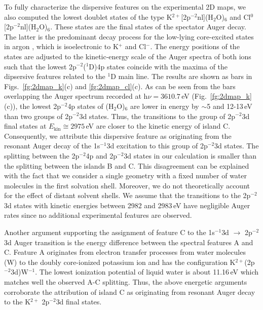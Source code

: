 To fully characterize the dispersive features on the experimental 2D maps, we also computed the lowest doublet states of the type K$^{2+}$[2p$^{-2}$nl](H$_2$O)$_6$ and Cl$^{0}$[2p$^{-2}$nl](H$_2$O)$_6$. These states are the final states of the spectator Auger decay. The latter is the predominant decay process for the low-lying core-excited states in argon \citep{ceolin15:022502}, which is isoelectronic to K$^+$ and Cl$^-$. The energy positions of the states are adjusted to the kinetic-energy scale of the Auger spectra of both ions such that the lowest 2p$^{-2}$($^1$D)4p states coincide with the maxima of the dipsersive features related to the $^1$D main line. The results are shown as bars in Figs.\ \ref{fg:2dmap_k}(c) and \ref{fg:2dmap_cl}(c). As can be seen from the bars overlapping the Auger spectrum recorded at h$\nu = 3610.7$\,eV (Fig.\ \ref{fg:2dmap_k}(c)), the lowest 2p$^{-2}$4p states of \ki(H$_2$O)$_6$ are lower in energy by $\sim$5 and 12-13\,eV than two groups of 2p$^{-2}$3d states. Thus, the transitions to the group of 2p$^{-2}$3d final states at $E_{\text{kin}}\cong 2975$\,eV are closer to the kinetic energy of island C. Consequently, we attribute this dispersive feature as originating from the resonant Auger decay of the 1s$^{-1}$3d excitation to this group of 2p$^{-2}$3d states. The splitting between the 2p$^{-2}$4p and 2p$^{-2}$3d states in our calculation is smaller than the splitting between the islands B and C. This disagreement can be explained with the fact that we consider a single geometry with a fixed number of water molecules in the first solvation shell. Moreover, we do not theoretically account for the effect of distant solvent shells. We assume that the transitions to the 2p$^{-2}$3d states with kinetic energies between 2982 and 2983\,eV have negligible Auger rates since no additional experimental features are observed.


Another argument supporting the assignment of feature C to the 1s$^{-1}$3d $\rightarrow$ 2p$^{-2}$3d Auger transition is the energy difference between the spectral features A and C. Feature A originates from electron transfer processes from water molecules (W) to the doubly core-ionized potassium ion and has the configuration K$^{2+}$(2p$^{-2}$3d)W$^{-1}$. The lowest ionization potential of liquid water is about 11.16\,eV \cite{winter04:2625} which matches well the observed A-C splitting. Thus, the above energetic arguments corroborate the attribution of island C as originating from resonant Auger decay to the K$^{2+}$ 2p$^{-2}$3d final states.


